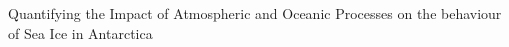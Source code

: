 Quantifying the Impact of Atmospheric and Oceanic Processes on the behaviour of Sea Ice in Antarctica